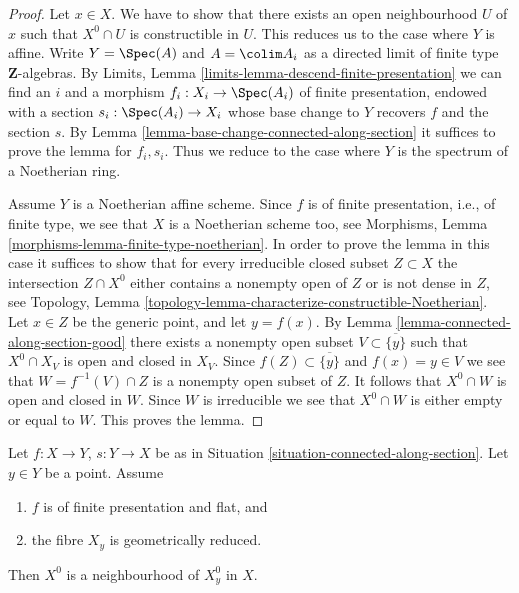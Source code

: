 \begin{proof}
Let $x \in X$. We have to show that there exists an open neighbourhood
$U$ of $x$ such that $X^0 \cap U$ is constructible in $U$.
This reduces us to the case where $Y$ is affine.
Write $Y = \Spec(A)$ and $A = \colim A_i$ as a directed
limit of finite type $\mathbf{Z}$-algebras. By
Limits, Lemma \ref{limits-lemma-descend-finite-presentation}
we can find an $i$ and a morphism $f_i : X_i \to \Spec(A_i)$ of
finite presentation, endowed with a section $s_i : \Spec(A_i) \to X_i$
whose base change to $Y$ recovers $f$ and the section $s$. By
Lemma \ref{lemma-base-change-connected-along-section}
it suffices to prove the lemma for $f_i, s_i$. Thus we reduce to
the case where $Y$ is the spectrum of a Noetherian ring.

\medskip\noindent
Assume $Y$ is a Noetherian affine scheme. Since $f$ is of finite presentation,
i.e., of finite type, we see that $X$ is a Noetherian scheme too, see
Morphisms, Lemma \ref{morphisms-lemma-finite-type-noetherian}.
In order to prove the lemma in
this case it suffices to show that for every irreducible closed subset
$Z \subset X$ the intersection $Z \cap X^0$ either contains a nonempty
open of $Z$ or is not dense in $Z$, see
Topology, Lemma \ref{topology-lemma-characterize-constructible-Noetherian}.
Let $x \in Z$ be the generic point, and let $y = f(x)$. By
Lemma \ref{lemma-connected-along-section-good}
there exists a nonempty open subset $V \subset \overline{\{y\}}$ such
that $X^0 \cap X_V$ is open and closed in $X_V$. Since
$f(Z) \subset \overline{\{y\}}$ and $f(x) = y \in V$ we see that
$W = f^{-1}(V) \cap Z$ is a nonempty open subset of $Z$. It follows that
$X^0 \cap W$ is open and closed in $W$. Since $W$ is irreducible
we see that $X^0 \cap W$ is either empty or equal to $W$.
This proves the lemma.
\end{proof}

\begin{lemma}
\label{lemma-connected-along-section-open-neighbourhood}
Let $f : X \to Y$, $s : Y \to X$ be as in
Situation \ref{situation-connected-along-section}.
Let $y \in Y$ be a point.
Assume
\begin{enumerate}
\item $f$ is of finite presentation and flat, and
\item the fibre $X_y$ is geometrically reduced.
\end{enumerate}
Then $X^0$ is a neighbourhood of $X^0_y$ in $X$.
\end{lemma}

